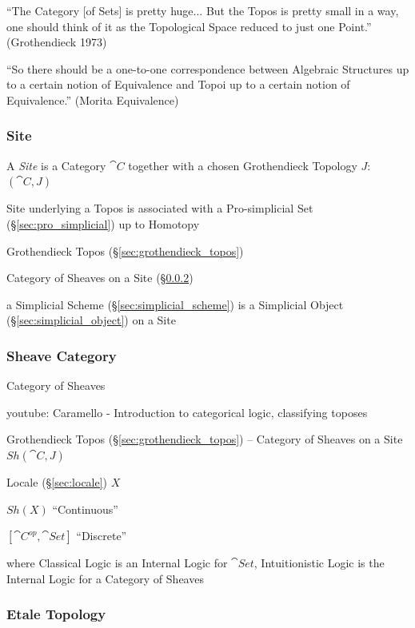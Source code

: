 ``The Category [of Sets] is pretty huge... But the Topos is pretty small in a
way, one should think of it as the Topological Space reduced to just one
Point.'' (Grothendieck 1973)

``So there should be a one-to-one correspondence between Algebraic Structures up
to a certain notion of Equivalence and Topoi up to a certain notion of
Equivalence.'' (Morita Equivalence)



\subsubsection{Site}\label{sec:site}

A \emph{Site} is a Category $\cat{C}$ together with a chosen Grothendieck
Topology $J$: $(\cat{C},J)$

Site underlying a Topos is associated with a Pro-simplicial Set
(\S\ref{sec:pro_simplicial}) up to Homotopy

Grothendieck Topos (\S\ref{sec:grothendieck_topos})

Category of Sheaves on a Site (\S\ref{sec:sheave_category})

a Simplicial Scheme (\S\ref{sec:simplicial_scheme}) is a Simplicial Object
(\S\ref{sec:simplicial_object}) on a Site



\subsubsection{Sheave Category}\label{sec:sheave_category}

Category of Sheaves

youtube: Caramello - Introduction to categorical logic, classifying
toposes

Grothendieck Topos (\S\ref{sec:grothendieck_topos}) -- Category of
Sheaves on a Site $Sh(\cat{C},J)$

Locale (\S\ref{sec:locale}) $X$

$Sh(X)$ ``Continuous''

$[\cat{C}^{op},\cat{Set}]$ ``Discrete''

where Classical Logic is an Internal Logic for $\cat{Set}$, Intuitionistic
Logic is the Internal Logic for a Category of Sheaves



\subsubsection{Etale Topology}\label{sec:etale_topology}

